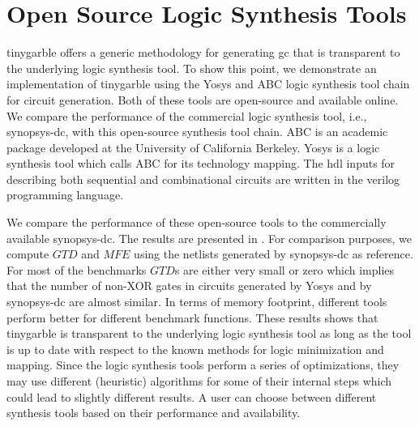 \chapter{Open Source Logic Synthesis Tools}\label{chap:open-source}
\gls{tinygarble} offers a generic methodology for generating \acrshort{gc} that is transparent to the underlying logic synthesis tool.
To show this point, we demonstrate an implementation of \gls{tinygarble} using the Yosys \cite{tool:Yosys} and ABC \cite{tool:ABC} logic synthesis tool chain for circuit generation.
Both of these tools are open-source and available online.
We compare the performance of the commercial logic synthesis tool, i.e., \gls{synopsys-dc}, with this open-source synthesis tool chain.
ABC is an academic package developed at the University of California Berkeley.
Yosys is a logic synthesis tool which calls ABC for its technology mapping.
The \acrshort{hdl} inputs for describing both sequential and combinational circuits are written in the \gls{verilog} programming language.

We compare the performance of these open-source tools to the commercially available \gls{synopsys-dc}.
The results are presented in .
For comparison purposes, we compute $\mathit{GTD}$ and $\mathit{MFE}$ using the netlists generated by \gls{synopsys-dc} as reference.
For most of the benchmarks $\mathit{GTD}$s are either very small or zero which implies that the number of non-XOR gates in circuits generated by Yosys and by \gls{synopsys-dc} are almost similar.
In terms of memory footprint, different tools perform better for different benchmark functions.
These results shows that \gls{tinygarble} is transparent to the underlying logic synthesis tool as long as the tool is up to date with respect to the known methods for logic minimization and mapping.
Since the logic synthesis tools perform a series of optimizations, they may use different (heuristic) algorithms for some of their internal steps which could lead to slightly different results.
A user can choose between different synthesis tools based on their performance and availability.

